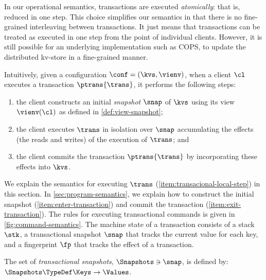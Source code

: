 
In our operational semantics, transactions are executed \emph{atomically}: that is, reduced in one step.
This choice simplifies our semantics in that there is no fine-grained interleaving between transactions.
It just means that transactions can be treated as executed in one step from the point of individual clients.
However, it is still possible for an underlying implementation such as COPS,
to update the distributed kv-store in a fine-grained manner.

Intuitively, given a configuration \(\conf = (\kvs, \vienv)\), 
when a client \(\cl\) executes a transaction \(\ptrans{\trans}\), 
it performs the following steps: 
\begin{enumerate}
	\item \label{item:enter-transaction} the client constructs an initial \emph{snapshot} \(\snap\) of \(\kvs\) 
        using its view \(\vienv(\cl)\) as defined in \cref{def:view-snapshot};  
	\item \label{item:transacional-local-step} the client executes \(\trans\) in isolation over \(\snap\)
        accumulating the effects (the reads and writes) of the execution of \(\trans\); and
	\item \label{item:exit-transaction} the client commits the transaction \(\ptrans{\trans}\) by incorporating these effects into \(\kvs\).
\end{enumerate}
We explain the semantics for executing \( \trans \) (\cref{item:transacional-local-step}) in this section.
In \cref{sec:program-semantics},
we explain how to construct the initial snapshot (\cref{item:enter-transaction}) 
and commit the transaction (\cref{item:exit-transaction}).
The rules for executing transactional commands is given in \cref{fig:command-semantics}.
The machine state of a transaction consists of a stack \( \stk \),
a transactional snapshot \( \snap \) that tracks the current value for each key,
and a fingerprint \( \fp \) that tracks the effect of a transaction.

\begin{definition}
\label{def:heaps}
The set of \emph{transactional snapshots}, \( \Snapshots \ni \snap\),
is defined by: \( \Snapshots \TypeDef \Keys \to \Values\).
\end{definition}

